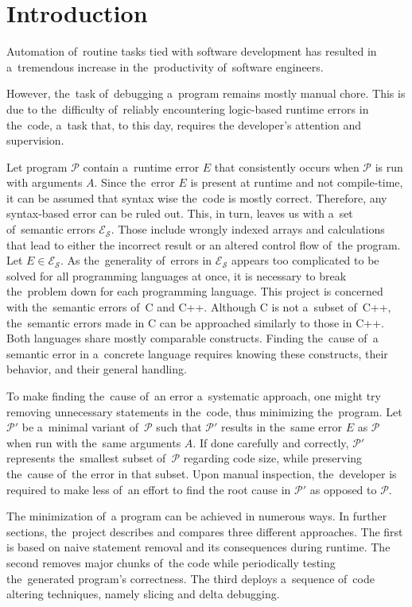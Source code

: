 \chapter{Introduction}



Automation of~routine tasks tied with software development has resulted in a~tremendous
increase in the~productivity of~software engineers. 

However, the~task of~debugging a~program
remains mostly manual chore. 
This is due to the~difficulty of~reliably encountering logic-based
runtime errors in the~code, a~task that, to this day, requires 
the developer's attention and supervision.

Let program $\mathcal{P}$ contain a~runtime error $E$ 
that consistently occurs when $\mathcal{P}$ is run 
with arguments $A$.
Since the~error $E$ is present at runtime and not compile-time,
it can be assumed that syntax wise the~code is mostly correct.
Therefore, any syntax-based error can be ruled out.
This, in turn, leaves us with a~set of~semantic errors $\mathcal{E_S}$.
Those include wrongly indexed arrays and calculations that lead to either
the incorrect result or an altered control flow of~the program. 
Let $E \in \mathcal{E_S}$. As the~generality of~errors in $\mathcal{E_S}$
appears too complicated to be solved for all programming languages at once, 
it is necessary to break the~problem down for each programming language. 
This project is concerned with the~semantic errors of~C and C++.
Although C is not a~subset of~C++, the~semantic errors made in C can be
approached similarly to those in C++.
Both languages share mostly comparable constructs.
Finding the~cause of~a semantic error in a~concrete language requires knowing
these constructs, their behavior, and their general handling.

To make finding the~cause of~an error a~systematic approach, one might try removing
unnecessary statements in the~code, thus minimizing the~program.
Let $\mathcal{P'}$ be a~minimal variant of~$\mathcal{P}$ such 
that $\mathcal{P'}$ results in the~same error $E$ as $\mathcal{P}$
when run with the~same arguments $A$.
If done carefully and correctly, $\mathcal{P'}$ represents the~smallest 
subset of~$\mathcal{P}$ regarding code
size, while preserving the~cause of~the error in that subset.
Upon manual inspection, the~developer is required to make less of~an effort to find
the root cause in $\mathcal{P'}$ as opposed to $\mathcal{P}$.

The minimization of~a program can be achieved in numerous ways.
In further sections, the~project describes and compares three different approaches.
The first is based on naive statement removal and its consequences during runtime.
The second removes major chunks of~the code while
periodically testing the~generated program's correctness.
The third deploys a~sequence of~code
altering techniques, namely slicing and delta debugging.

